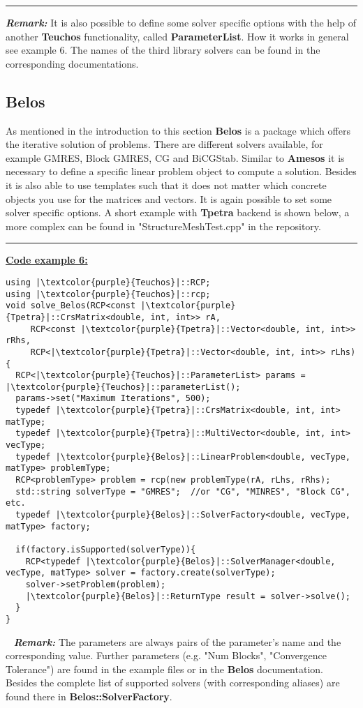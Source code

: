 \documentclass[10pt,a4paper,final,titlepage]{article}
\begin{document}
\noindent\rule{\textwidth}{0.5pt}
\newline \newline
\textbf{\textit{Remark:}} It is also possible to define some solver specific options with the help of another \textbf{Teuchos} functionality, called \textbf{ParameterList}. How it works in general see example 6. The names of the third library solvers can be found in the corresponding documentations.


\subsection{Belos}
As mentioned in the introduction to this section \textbf{Belos} is a package which offers the iterative solution of problems. There are different solvers available, for example GMRES, Block GMRES, CG and BiCGStab. Similar to \textbf{Amesos} it is necessary to define a specific linear problem object to compute a solution. Besides it is also able to use templates such that it does not matter which concrete objects you use for the matrices and vectors. It is again possible to set some solver specific options. A short example with \textbf{Tpetra} backend is shown below, a more complex can be found in "StructureMeshTest.cpp" in the repository.
\noindent\rule{\textwidth}{0.5pt}
\textbf{\underline{Code example 6:}}
\begin{verbatim}
using |\textcolor{purple}{Teuchos}|::RCP;
using |\textcolor{purple}{Teuchos}|::rcp;
void solve_Belos(RCP<const |\textcolor{purple}{Tpetra}|::CrsMatrix<double, int, int>> rA,
     RCP<const |\textcolor{purple}{Tpetra}|::Vector<double, int, int>> rRhs,
     RCP<|\textcolor{purple}{Tpetra}|::Vector<double, int, int>> rLhs)
{
  RCP<|\textcolor{purple}{Teuchos}|::ParameterList> params = |\textcolor{purple}{Teuchos}|::parameterList();
  params->set("Maximum Iterations", 500);
  typedef |\textcolor{purple}{Tpetra}|::CrsMatrix<double, int, int> matType;
  typedef |\textcolor{purple}{Tpetra}|::MultiVector<double, int, int> vecType;
  typedef |\textcolor{purple}{Belos}|::LinearProblem<double, vecType, matType> problemType;
  RCP<problemType> problem = rcp(new problemType(rA, rLhs, rRhs);
  std::string solverType = "GMRES";  //or "CG", "MINRES", "Block CG", etc.
  typedef |\textcolor{purple}{Belos}|::SolverFactory<double, vecType, matType> factory;
  
  if(factory.isSupported(solverType)){
    RCP<typedef |\textcolor{purple}{Belos}|::SolverManager<double, vecType, matType> solver = factory.create(solverType);
    solver->setProblem(problem);
    |\textcolor{purple}{Belos}|::ReturnType result = solver->solve();
  }
}
\end{verbatim}
\newpage \ \newline
\textbf{\textit{Remark:}} The parameters are always pairs of the parameter's name and the corresponding value. Further parameters (e.g. "Num Blocks", "Convergence Tolerance") are found in the example files or in the \textbf{Belos} documentation. Besides the complete list of supported solvers (with corresponding aliases) are found there in \textbf{Belos::SolverFactory}.
\end{document}
